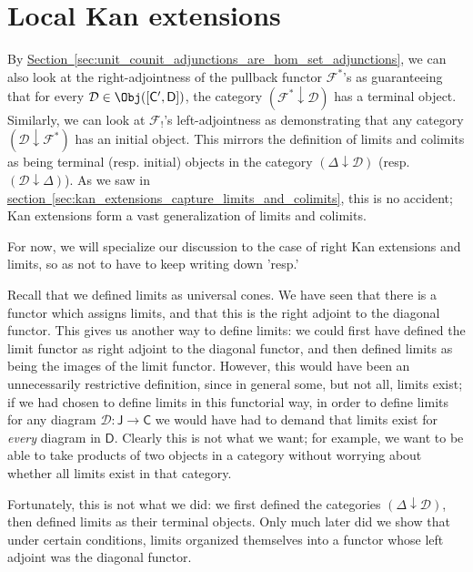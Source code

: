 \documentclass[notes.tex]{subfiles}
\begin{document}
\section{Local Kan extensions}
\label{sec:local_kan_extensions}

By \hyperref[sec:unit_counit_adjunctions_are_hom_set_adjunctions]{Section~\ref*{sec:unit_counit_adjunctions_are_hom_set_adjunctions}}, we can also look at the right-adjointness of the pullback functor $\mathcal{F}^{*}$'s as guaranteeing that for every $\mathcal{D} \in \Obj([\mathsf{C}', \mathsf{D}])$, the category $(\mathcal{F}^{*} \downarrow \mathcal{D})$ has a terminal object. Similarly, we can look at $\mathcal{F}_{!}$'s left-adjointness as demonstrating that any category $(\mathcal{D} \downarrow \mathcal{F}^{*})$ has an initial object. This mirrors the definition of limits and colimits as being terminal (resp. initial) objects in the category $(\Delta \downarrow \mathcal{D})$ (resp. $(\mathcal{D} \downarrow \Delta)$). As we saw in \hyperref[sec:kan_extensions_capture_limits_and_colimits]{section~\ref*{sec:kan_extensions_capture_limits_and_colimits}}, this is no accident; Kan extensions form a vast generalization of limits and colimits.

For now, we will specialize our discussion to the case of right Kan extensions and limits, so as not to have to keep writing down 'resp.'

Recall that we defined limits as universal cones. We have seen that there is a functor which assigns limits, and that this is the right adjoint to the diagonal functor. This gives us another way to define limits: we could first have defined the limit functor as right adjoint to the diagonal functor, and then defined limits as being the images of the limit functor. However, this would have been an unnecessarily restrictive definition, since in general some, but not all, limits exist; if we had chosen to define limits in this functorial way, in order to define limits for any diagram $\mathcal{D}\colon \mathsf{J} \to \mathsf{C}$ we would have had to demand that limits exist for \emph{every} diagram in $\mathsf{D}$. Clearly this is not what we want; for example, we want to be able to take products of two objects in a category without worrying about whether all limits exist in that category.

Fortunately, this is not what we did: we first defined the categories $(\Delta \downarrow \mathcal{D})$, then defined limits as their terminal objects. Only much later did we show that under certain conditions, limits organized themselves into a functor whose left adjoint was the diagonal functor.
\end{document}

